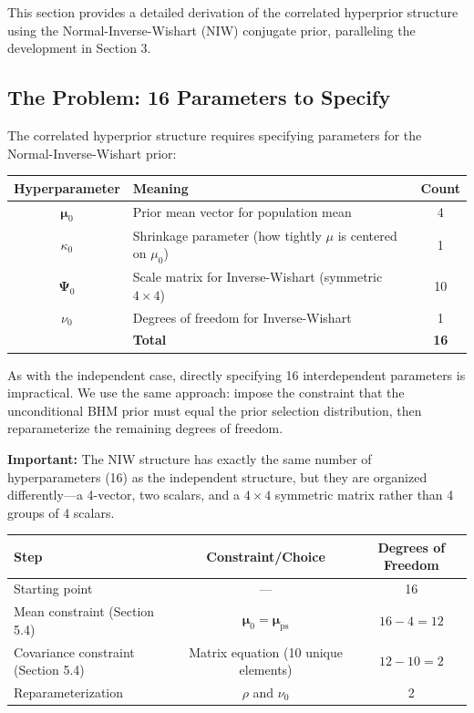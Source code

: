 \documentclass[11pt]{article}
\begin{document}
This section provides a detailed derivation of the correlated hyperprior structure using the Normal-Inverse-Wishart (NIW) conjugate prior, paralleling the development in Section 3.

\subsection{The Problem: 16 Parameters to Specify}

The correlated hyperprior structure requires specifying parameters for the Normal-Inverse-Wishart prior:
\begin{center}
\begin{tabular}{clc}
\toprule
Hyperparameter & Meaning & Count \\
\midrule
$\boldsymbol{\mu}_0$ & Prior mean vector for population mean & 4 \\
$\kappa_0$ & Shrinkage parameter (how tightly $\mu$ is centered on $\mu_0$) & 1 \\
$\boldsymbol{\Psi}_0$ & Scale matrix for Inverse-Wishart (symmetric $4 \times 4$) & 10 \\
$\nu_0$ & Degrees of freedom for Inverse-Wishart & 1 \\
\midrule
& \textbf{Total} & \textbf{16} \\
\bottomrule
\end{tabular}
\end{center}

As with the independent case, directly specifying 16 interdependent parameters is impractical. We use the same approach: impose the constraint that the unconditional BHM prior must equal the prior selection distribution, then reparameterize the remaining degrees of freedom.

\textbf{Important:} The NIW structure has exactly the same number of hyperparameters (16) as the independent structure, but they are organized differently---a 4-vector, two scalars, and a $4 \times 4$ symmetric matrix rather than 4 groups of 4 scalars.

\begin{center}
\begin{tabular}{lcc}
\toprule
Step & Constraint/Choice & Degrees of Freedom \\
\midrule
Starting point & --- & 16 \\
Mean constraint (Section 5.4) & $\boldsymbol{\mu}_0 = \boldsymbol{\mu}_{\text{ps}}$ & $16 - 4 = 12$ \\
Covariance constraint (Section 5.4) & Matrix equation (10 unique elements) & $12 - 10 = 2$ \\
\midrule
Reparameterization & $\rho$ and $\nu_0$ & 2 \\
\bottomrule
\end{tabular}
\end{center}
\end{document}
